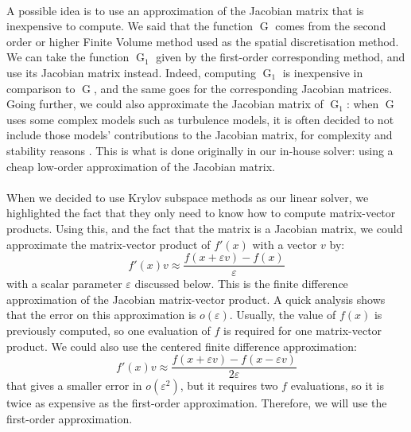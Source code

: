       \paragraph{}
      A possible idea is to use an approximation of the Jacobian matrix that is inexpensive to compute.
      We said that the function $\operatorname{G}$ comes from the second order or higher Finite Volume method used as the spatial discretisation method.
      We can take the function $\operatorname{G}_1$ given by the first-order corresponding method, and use its Jacobian matrix instead.
      Indeed, computing $\operatorname{G}_1$ is inexpensive in comparison to $\operatorname{G}$, and the same goes for the corresponding Jacobian matrices.
      Going further, we could also approximate the Jacobian matrix of $\operatorname{G}_1$: when $\operatorname{G}$ uses some complex models such as turbulence models, it is often decided to not include those models' contributions to the Jacobian matrix, for complexity and stability reasons .
      This is what is done originally in our in-house solver: using a cheap low-order approximation of the Jacobian matrix.

      \paragraph{}
      When we decided to use Krylov subspace methods as our linear solver, we highlighted the fact that they only need to know how to compute matrix-vector products.
      Using this, and the fact that the matrix is a Jacobian matrix, we could approximate the matrix-vector product of $f'\left(x\right)$ with a vector $v$ by:
      \begin{equation}\label{eq:matrix_free}
        f'\left(x\right) v \approx \frac{f\left(x + \varepsilon v\right) - f\left(x\right)}{\varepsilon}
      \end{equation}
      with a scalar parameter $\varepsilon$ discussed below.
      This is the finite difference approximation of the Jacobian matrix-vector product.
      A quick analysis shows that the error on this approximation is $o\left(\varepsilon\right)$.
      Usually, the value of $f\left(x\right)$ is previously computed, so one evaluation of $f$ is required for one matrix-vector product.
      We could also use the centered finite difference approximation:
      \begin{equation}
        f'\left(x\right) v \approx \frac{f\left(x + \varepsilon v\right) - f\left(x - \varepsilon v\right)}{2\varepsilon}
      \end{equation}
      that gives a smaller error in  $o\left(\varepsilon^2\right)$, but it requires two $f$ evaluations, so it is twice as expensive as the first-order approximation.
      Therefore, we will use the first-order approximation.

